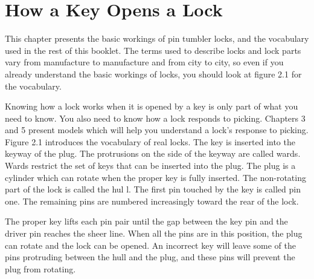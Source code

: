 \chapter{How a Key Opens a Lock}
This chapter presents the basic workings of pin tumbler locks, and the vocabulary used in the
rest of this booklet. The terms used to describe locks and lock parts vary from manufacture
to manufacture and from city to city, so even if you already understand the basic workings
of locks, you should look at figure 2.1 for the vocabulary.

Knowing how a lock works when it is opened by a key is only part of what you need to
know. You also need to know how a lock responds to picking. Chapters 3 and 5 present
models which will help you understand a lock's response to picking.
Figure 2.1 introduces the vocabulary of real locks. The key is inserted into the keyway
of the plug. The protrusions on the side of the keyway are called wards. Wards restrict the
set of keys that can be inserted into the plug. The plug is a cylinder which can rotate when
the proper key is fully inserted. The non-rotating part of the lock is called the hul l. The
first pin touched by the key is called pin one. The remaining pins are numbered increasingly
toward the rear of the lock.

The proper key lifts each pin pair until the gap between the key pin and the driver pin
reaches the sheer line. When all the pins are in this position, the plug can rotate and the
lock can be opened. An incorrect key will leave some of the pins protruding between the
hull and the plug, and these pins will prevent the plug from rotating.

